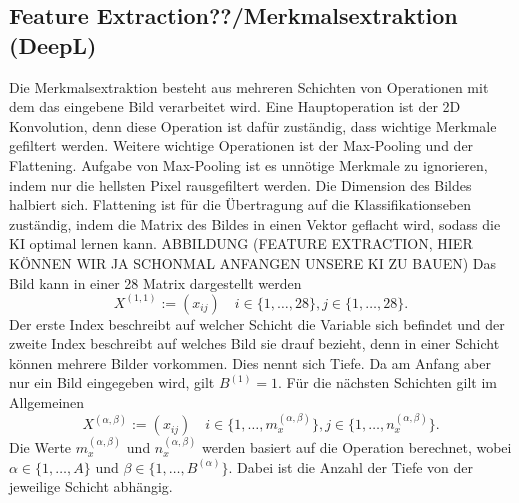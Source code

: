 \documentclass[11pt]{article}
\begin{document}
\subsection{Feature Extraction??/Merkmalsextraktion (DeepL)}
Die Merkmalsextraktion besteht aus mehreren Schichten von Operationen mit dem das eingebene Bild verarbeitet wird.
Eine Hauptoperation ist der 2D Konvolution, denn diese Operation ist dafür zuständig, dass wichtige Merkmale gefiltert werden.
Weitere wichtige Operationen ist der Max-Pooling und der Flattening. Aufgabe von Max-Pooling ist es unnötige Merkmale
zu ignorieren, indem nur die hellsten Pixel rausgefiltert werden. Die Dimension des Bildes halbiert sich. Flattening ist für die Übertragung auf die Klassifikationseben zuständig,
indem die Matrix des Bildes in einen Vektor geflacht wird, sodass die KI optimal lernen kann.
ABBILDUNG (FEATURE EXTRACTION, HIER KÖNNEN WIR JA SCHONMAL ANFANGEN UNSERE KI ZU BAUEN)
Das Bild kann in einer 28 Matrix dargestellt werden
\begin{equation}
    X^{(1,1)} := (x_{ij}) \quad i \in \{1,\ldots,28\}, j \in \{1,\ldots,28\}.
\end{equation}
Der erste Index beschreibt auf welcher Schicht die Variable sich befindet und der zweite Index beschreibt auf welches
Bild sie drauf bezieht, denn in einer Schicht können mehrere Bilder vorkommen. Dies nennt sich Tiefe. Da am Anfang aber nur ein Bild eingegeben wird, gilt
$B^{(1)} = 1$. Für die nächsten Schichten gilt im Allgemeinen
\begin{equation}
    X^{(\alpha,\beta)} := (x_{ij}) \quad i \in \{1,\ldots,m_{x}^{(\alpha,\beta)}\}, j \in \{1,\ldots,n_{x}^{(\alpha,\beta)}\}.
\end{equation}
Die Werte $m_{x}^{(\alpha,\beta)}$ und $n_{x}^{(\alpha,\beta)}$ werden basiert auf die Operation berechnet, wobei
$\alpha \in \{1,\ldots,A\}$ und $\beta \in \{1,\ldots,B^{(\alpha)}\}$. Dabei ist die Anzahl der Tiefe von der jeweilige Schicht abhängig.
\end{document}
